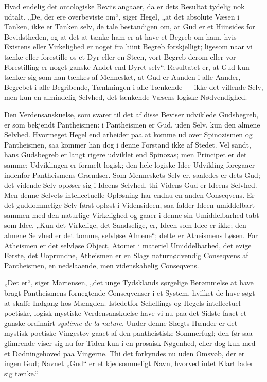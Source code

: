 \documentclass[12pt]{book}
\begin{document}
Hvad endelig det ontologiske Beviis angaaer, da er
dets Resultat tydelig nok udtalt. „De, der ere overbeviste om“,
siger Hegel, „at det absolute Væsen i Tanken, ikke er Tanken selv,
de tale bestandigen om, at Gud er et Hiinsides for Bevidstheden, og
at det at tænke ham er at have et Begreb om ham, hvis Existens eller
Virkelighed er noget fra hiint Begreb forskjelligt; ligesom naar vi
tænke eller forestille os et Dyr eller en Steen, vort Begreb derom
eller vor Forestilling er noget ganske Andet end Dyret selv“.
Resultatet er, at Gud kun tænker sig som han tænkes af Mennesket, at
Gud er Aanden i alle Aander, Begrebet i alle Begribende, Tænkningen
i alle Tænkende --- ikke det villende Selv, men kun en almindelig
Selvhed, det tænkende Væsens logiske Nødvendighed.

Den Verdensanskuelse, som svarer til det af disse Beviser udviklede
Gudsbegreb, er som bekjendt Pantheismen: i Pantheismen er Gud, uden
Selv, kun den almene Selvhed. Hvormeget Hegel end arbeider paa at
komme ud over Spinozismen og Pantheismen, saa kommer han dog i denne
Forstand ikke af Stedet. Vel sandt, hans Gudsbegreb er langt rigere
udviklet end Spinozas; men Principet er det samme; Udviklingen er
formelt logisk; den hele logiske Idee-Udvikling foregaaer indenfor
Pantheismens Grændser. Som Menneskets Selv er, saaledes er dets Gud;
det vidende Selv opløser sig i Ideens Selvhed, thi Videns Gud er
Ideens Selvhed. Men denne Selvets intellectuelle Opløsning har endnu
en anden Conseqvens. Er det guddommelige Selv først opløst i
Vidensideen, saa falder Ideen umiddelbart sammen med den naturlige
Virkelighed og gaaer i denne sin Umiddelbarhed tabt som Idee. „Kun
det Virkelige, det Sandselige, er, Ideen som Idee er ikke; den
almene Selvhed er det tomme, selvløse Almene“; dette er Atheismens
Løsen. For Atheismen er det selvløse Object, Atomet i materiel
Umiddelbarhed, det evige Første, det Uoprundne,
Atheismen er en Slags naturnødvendig Conseqvens af Pantheismen, en
nedslaaende, men videnskabelig Conseqvens.

„Det er“, siger Martensen, „det unge Tydsklands sørgelige Berømmelse
at have bragt Pantheismens fornegtende Conseqvenser i et System,
hvilket de have søgt at skaffe Indgang hos Mængden. Istedetfor
Schellings og Hegels intellectuel-poetiske, logisk-mystiske
Verdensanskuelse have vi nu paa det Sidste faaet et ganske
ordinairt \textit{système de la nature}. Under denne Slægts Hænder
er det mystisk-poetiske Vingestøv gaaet af den pantheistiske
Sommerfugl; den før saa glimrende viser sig nu for Tiden kun i en
prosaisk Nøgenhed, eller dog kun med et Dødningehoved paa Vingerne.
Thi det forkyndes nu uden Omsvøb, der er ingen Gud; Navnet „Gud“ er
et kjedsommeligt Navn, hvorved intet Klart lader sig tænke.“
\end{document}
